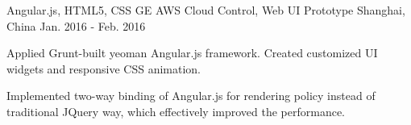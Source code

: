 \begin{cventries}
\cventry
{Angular.js, HTML5, CSS} %
{GE AWS Cloud Control, Web UI Prototype} %
{Shanghai, China} %
{Jan. 2016 - Feb. 2016} %
{ %
\begin{cvitems}
\item {Applied Grunt-built yeoman Angular.js framework. Created customized UI widgets and responsive CSS animation.}
\item {Implemented two-way binding of Angular.js for rendering policy instead of traditional JQuery way, which effectively improved the performance.}
\end{cvitems}
}


\end{cventries}
